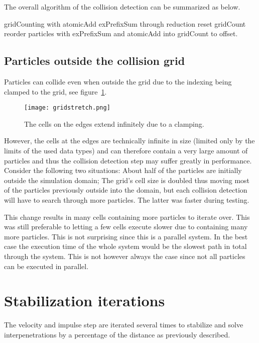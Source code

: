 The overall algorithm of the collision detection can be summarized as below.

\begin{algorithm}[H]
  \begin{algorithmic}[1]
  \State gridCounting with atomicAdd
  \State exPrefixSum through reduction
  \State reset gridCount
  \State reorder particles with exPrefixSum and atomicAdd into gridCount to offset.
  \end{algorithmic}
\end{algorithm}

\subsection{Particles outside the collision grid}
Particles can collide even when outside the grid due to the indexing
being clamped to the grid, see figure~\ref{fig:gridStretch}.

\begin{figure}[H]
  \centering
  \texttt{[image: gridstretch.png]}
  \caption{The cells on the edges extend infinitely due to a clamping.\label{fig:gridStretch}}
\end{figure}

However, the cells at the edges are technically infinite
in size (limited only by the limits of the used data types) and can therefore contain a very large amount of particles and thus the collision
detection step may suffer greatly in performance. Consider the following two situations:
About half of the particles are initially outside the simulation domain; The grid's
cell size is doubled thus moving most of the particles previously outside into the domain, but
each collision detection will have to search through more particles.
The latter was faster during testing.

This change results in many cells containing more particles to iterate over. This was still preferable to
 letting a few cells execute slower due to containing many more particles.
This is not surprising since this is a
parallel system. In the best case the execution time of the whole system would be
the slowest path in total through the system. This is not however always the case
since not all particles can be executed in parallel.

\section{Stabilization iterations} \label{sec:stabil}
The velocity and impulse step are iterated several times to stabilize and solve
interpenetrations by a percentage of the distance as previously described.

